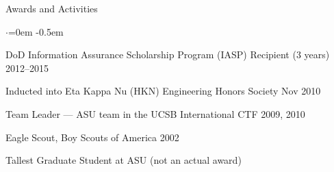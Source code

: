 \documentclass{resume} %
\begin{document}

\begin{rSection}{Awards and Activities}

\begin{list}{$\cdot$}{\leftmargin=0em} %
   \itemsep -0.5em
	
	\item DoD Information Assurance Scholarship Program (IASP) Recipient (3 years) \hfill 2012--2015

	\item Inducted into Eta Kappa Nu (HKN) Engineering Honors Society \hfill Nov 2010
	
	\item Team Leader --- ASU team in the UCSB International CTF \hfill 2009, 2010
	
	\item Eagle Scout, Boy Scouts of America \hfill 2002
	
	\item Tallest Graduate Student at ASU \hfill (not an actual award)

\end{list}

\end{rSection}





\end{document}
